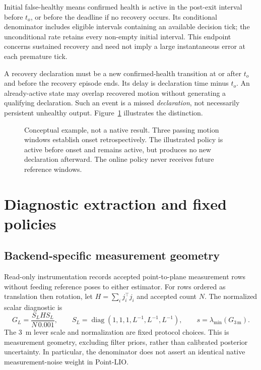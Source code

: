 \documentclass[11pt,a4paper]{article}
\newcommand{\diag}{\operatorname{diag}}
\begin{document}
Initial false-healthy means confirmed health is active in the post-exit interval
before $t_o$, or before the deadline if no recovery occurs. Its conditional
denominator includes eligible intervals containing an available decision
tick; the unconditional rate retains every non-empty initial interval.
This endpoint concerns sustained recovery and need not imply a large
instantaneous error at each premature tick.

A recovery declaration must be a new confirmed-health transition at or
after $t_o$ and before the recovery episode ends. Its delay is declaration
time minus $t_o$. An already-active state may overlap recovered motion
without generating a qualifying declaration. Such an event is a missed
\emph{declaration}, not necessarily persistent unhealthy output.
Figure~\ref{fig:timing} illustrates the distinction.

\begin{figure}[htbp]
\centering
{}
\caption{Conceptual example, not a native result. Three passing motion
windows establish onset retrospectively. The illustrated policy is active
before onset and remains active, but produces no new declaration afterward.
The online policy never receives future reference windows.}\label{fig:timing}
\end{figure}

\section{Diagnostic extraction and fixed policies}
\subsection{Backend-specific measurement geometry}
Read-only instrumentation records accepted point-to-plane measurement rows
without feeding reference poses to either estimator. For rows ordered as
translation then rotation, let $H=\sum_i j_i^\top j_i$ and accepted count $N$.
The normalized scalar diagnostic is
\begin{equation}
G_L=\frac{S_L H S_L}{N\,0.001},\qquad
S_L=\diag(1,1,1,L^{-1},L^{-1},L^{-1}),\qquad
s=\lambda_{\min}(G_{3\,\mathrm m}).
\end{equation}
The 3~m lever scale and normalization are fixed protocol choices. This is
measurement geometry, excluding filter priors, rather than calibrated
posterior uncertainty. In particular, the denominator does not assert an
identical native measurement-noise weight in Point-LIO.
\end{document}
